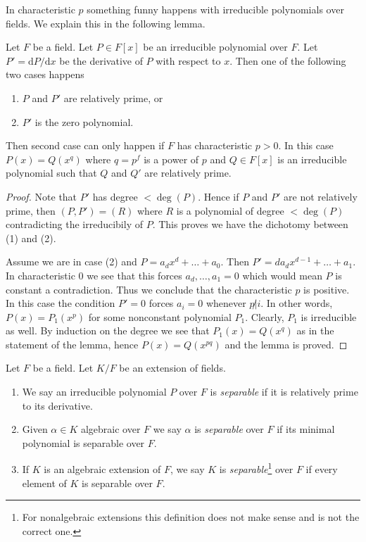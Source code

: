 \noindent
In characteristic $p$ something funny happens with irreducible polynomials
over fields. We explain this in the following lemma.

\begin{lemma}
\label{lemma-irreducible-polynomials}
Let $F$ be a field. Let $P \in F[x]$ be an irreducible polynomial over $F$.
Let $P' = \text{d}P/\text{d}x$ be the derivative of $P$ with respect
to $x$. Then one of the following two cases happens
\begin{enumerate}
\item $P$ and $P'$ are relatively prime, or
\item $P'$ is the zero polynomial.
\end{enumerate}
Then second case can only happen if $F$ has characteristic $p > 0$.
In this case $P(x) = Q(x^q)$ where $q = p^f$ is a power of $p$ and
$Q \in F[x]$ is an irreducible polynomial such that $Q$ and $Q'$
are relatively prime.
\end{lemma}

\begin{proof}
Note that $P'$ has degree $< \deg(P)$. Hence if $P$ and $P'$ are not relatively
prime, then $(P, P') = (R)$ where $R$ is a polynomial of degree $< \deg(P)$
contradicting the irreducibily of $P$. This proves we have the dichotomy
between (1) and (2).

\medskip\noindent
Assume we are in case (2) and $P = a_d x^d + \ldots + a_0$. Then
$P' = da_d x^{d - 1} + \ldots + a_1$. In characteristic $0$ we see
that this forces $a_d, \ldots, a_1 = 0$ which would mean $P$ is constant
a contradiction. Thus we conclude that the characteristic $p$ is positive.
In this case the condition $P' = 0$ forces $a_i = 0$ whenever $p \not | i$.
In other words, $P(x) = P_1(x^p)$ for some nonconstant polynomial $P_1$.
Clearly, $P_1$ is irreducible as well. By induction on the degree we
see that $P_1(x) = Q(x^q)$ as in the statement of the lemma, hence
$P(x) = Q(x^{pq})$ and the lemma is proved.
\end{proof}

\begin{definition}
\label{definition-separable}
Let $F$ be a field. Let $K/F$ be an extension of fields.
\begin{enumerate}
\item We say an irreducible polynomial $P$ over $F$ is {\it separable}
if it is relatively prime to its derivative.
\item Given $\alpha \in K$ algebraic over $F$ we say $\alpha$ is
{\it separable} over $F$ if its minimal polynomial is separable over $F$.
\item If $K$ is an algebraic extension of $F$, we say $K$ is
{\it separable}\footnote{For nonalgebraic extensions
this definition does not make sense and is not the correct one.}
over $F$ if every element of $K$ is separable over $F$.
\end{enumerate}
\end{definition}

